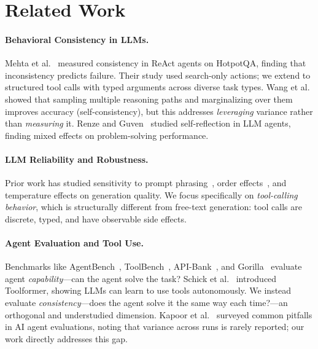 \documentclass[letterpaper]{article}
\begin{document}
\section{Related Work}

\paragraph{Behavioral Consistency in LLMs.}
Mehta et al.~\cite{mehta2026disagree} measured consistency in ReAct agents on HotpotQA, finding that inconsistency predicts failure. Their study used search-only actions; we extend to structured tool calls with typed arguments across diverse task types. Wang et al.~\cite{wang2023selfconsistency} showed that sampling multiple reasoning paths and marginalizing over them improves accuracy (self-consistency), but this addresses \textit{leveraging} variance rather than \textit{measuring} it. Renze and Guven~\cite{renze2024self} studied self-reflection in LLM agents, finding mixed effects on problem-solving performance.

\paragraph{LLM Reliability and Robustness.}
Prior work has studied sensitivity to prompt phrasing~\cite{sclar2024quantifying}, order effects~\cite{lu2022fantastically}, and temperature effects on generation quality. We focus specifically on \textit{tool-calling behavior}, which is structurally different from free-text generation: tool calls are discrete, typed, and have observable side effects.

\paragraph{Agent Evaluation and Tool Use.}
Benchmarks like AgentBench~\cite{liu2023agentbench}, ToolBench~\cite{qin2023toolllm}, API-Bank~\cite{li2023apibank}, and Gorilla~\cite{patil2023gorilla} evaluate agent \textit{capability}---can the agent solve the task? Schick et al.~\cite{schick2023toolformer} introduced Toolformer, showing LLMs can learn to use tools autonomously. We instead evaluate \textit{consistency}---does the agent solve it the same way each time?---an orthogonal and understudied dimension. Kapoor et al.~\cite{kapoor2024ai} surveyed common pitfalls in AI agent evaluations, noting that variance across runs is rarely reported; our work directly addresses this gap.
\end{document}
